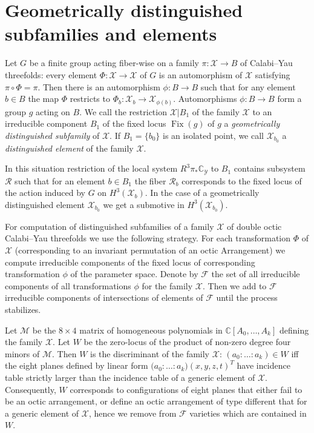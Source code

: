 \documentclass[12pt]{amsart}
\theoremstyle{plain}
\theoremstyle{remark}
\theoremstyle{definition}
\newcommand{\lra}{\longrightarrow}
\newcommand\CC{{\mathbb C}}
\numberwithin{table}{section}
\begin{document}
\section{Geometrically distinguished subfamilies and elements}
\label{sec:dist}
Let $G$ be a finite group acting fiber-wise on a family $\pi:\mathcal X\lra B$ of Calabi--Yau threefolds: every element  $\Phi:\mathcal X\lra\mathcal X$ of $G$ is an automorphism of $\mathcal X$  satisfying $\pi\circ\Phi=\pi$. Then there is an automorphism $\phi:B\lra B$ such that for any element $b\in B$ the map $\Phi$ restricts to $\Phi_{b}:\mathcal X_{b}\lra \mathcal X_{\phi(b)}$.
Automorphisms $\phi:B\lra B$ form a group $g$ acting on $B$.
We call the restriction $\mathcal X|B_{1}$ of the family $\mathcal X$
to an irreducible component $B_{1}$ of the fixed locus $\operatorname{Fix}(g)$ of $g$ a \emph{geometrically distinguished subfamily} of $\mathcal X$. If $B_{1}=\{b_{0}\}$ is an isolated point, we call $\mathcal X_{b_{0}}$ a \emph{distinguished element} of the family $\mathcal X$.


In this situation restriction of the local system $R^{3}\pi_{*}\mathbb C_{\mathcal Y}$ to $B_{1}$ contains subsystem $\mathcal R$ such that for an element $b\in B_{1}$ the fiber $\mathcal R_{b}$ corresponds to the fixed locus of the action induced by $G$ on $H^{3}(\mathcal X_{b})$. In the case of a geometrically distinguished element $\mathcal X_{b_{0 }}$ we get a submotive in $H^{3}(\mathcal X_{b_{0}})$.

For computation of distinguished subfamilies of a family $\mathcal X$ of double octic Calabi--Yau threefolds we use the following strategy. For each transformation $\Phi$ of $\mathcal X$ (corresponding to an invariant permutation of an octic Arrangement) we compute irreducible components of the fixed locus of corresponding transformation $\phi$ of the parameter space. Denote by $\mathcal F$ the set of all irreducible components of all transformations $\phi$ for the family $\mathcal X$. Then we add to $\mathcal F$ irreducible components of intersections of elements of $\mathcal F$ until the process stabilizes.

Let $\mathcal M$ be the $8\times4$ matrix  of homogeneous polynomials in $\CC[A_{0},\dots,A_{k}]$ defining the family $\mathcal X$.
Let $W$ be the zero-locus of the product of non-zero degree four minors of $\mathcal M$. Then $W$ is the discriminant of the family $\mathcal X$: $(a_{0}:\dots:a_{k})\in W$ iff the eight planes defined by linear form $\mathcal(a_{0}:\dots:a_{k}) (x,y,z,t)^{T}$ have incidence table strictly larger than the incidence table of a generic element of $\mathcal X$.
Consequently, $W$ corresponds to configurations of eight planes that either fail to be an octic arrangement, or define an octic arrangement of type different that for a generic element of $\mathcal X$, hence we remove from $\mathcal F$ varieties which are contained in $W$.
\end{document}

